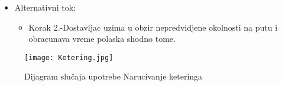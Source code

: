 \documentclass[a4paper]{article}
\begin{document}
      \begin{itemize}
        \item Alternativni tok:
          \begin{itemize}
        \item Korak 2.-Dostavljac uzima u obzir nepredvidjene okolnosti na putu i obracunava vreme polaska shodno tome.
    \end{itemize}
    \end{itemize}
    
\begin{figure}[htp]
    \centering
    \texttt{[image: Ketering.jpg]}
    \caption{Dijagram slučaja upotrebe Narucivanje keteringa}
    \label{fig:Ketering}
\end{figure}

\end{document}
